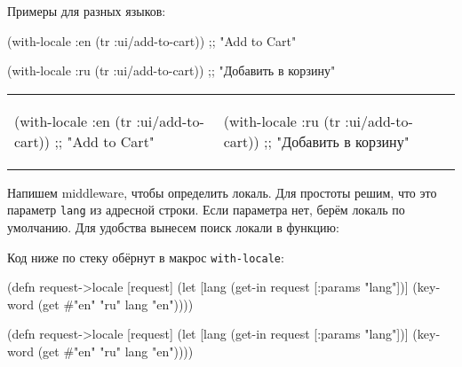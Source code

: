 Примеры для разных языков:

\ifnarrow

\begin{clojure}
(with-locale :en
  (tr :ui/add-to-cart))
;; "Add to Cart"
\end{clojure}

\splitter

\begin{clojure}
(with-locale :ru
  (tr :ui/add-to-cart))
;; "Добавить в корзину"
\end{clojure}

\else


\noindent
\begin{tabular}{ @{}p{5cm} @{}p{5cm} }

  \begin{clojure}
(with-locale :en
  (tr :ui/add-to-cart))
;; "Add to Cart"
  \end{clojure}

&

  \begin{clojure}
(with-locale :ru
  (tr :ui/add-to-cart))
;; "Добавить в корзину"
  \end{clojure}

\end{tabular}


\fi


Напишем middleware, чтобы определить локаль. Для простоты решим, что это
параметр \verb|lang| из адресной строки. Если параметра нет, берём локаль по
умолчанию. Для удобства вынесем поиск локали в функцию:

Код ниже по стеку обёрнут в макрос \verb|with-locale|:

\ifnarrow

\begin{english}
  \begin{clojure}
(defn request->locale [request]
  (let [lang (get-in request
               [:params "lang"])]
    (keyword
      (get #{"en" "ru"} lang "en"))))
  \end{clojure}
\end{english}

\else

\begin{english}
  \begin{clojure}
(defn request->locale [request]
  (let [lang (get-in request [:params "lang"])]
    (keyword (get #{"en" "ru"} lang "en"))))
  \end{clojure}
\end{english}

